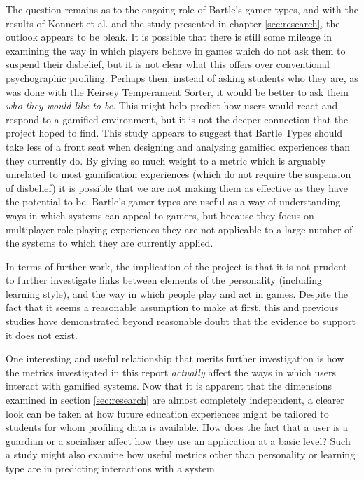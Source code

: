 \documentclass[12pt,a4paper,twoside]{report}
\begin{document}
The question remains as to the ongoing role of Bartle's gamer types, and with the results of Konnert et al. \cite{konertmodeling} and the study presented in chapter \ref{sec:research}, the outlook appears to be bleak. It is possible that there is still some mileage in examining the way in which players behave in games which do not ask them to suspend their disbelief, but it is not clear what this offers over conventional psychographic profiling. Perhaps then, instead of asking students who they are, as was done with the Keirsey Temperament Sorter, it would be better to ask them \textit{who they would like to be}. This might help predict how users would react and respond to a gamified environment, but it is not the deeper connection that the project hoped to find. This study appears to suggest that Bartle Types should take less of a front seat when designing and analysing gamified experiences than they currently do. By giving so much weight to a metric which is arguably unrelated to most gamification experiences (which do not require the suspension of disbelief) it is possible that we are not making them as effective as they have the potential to be. Bartle's gamer types are useful as a way of understanding ways in which systems can appeal to gamers, but because they focus on multiplayer role-playing experiences they are not applicable to a large number of the systems to which they are currently applied.

In terms of further work, the implication of the project is that it is not prudent to further investigate links between elements of the personality (including learning style), and the way in which people play and act in games. Despite the fact that it seems a reasonable assumption to make at first, this and previous studies have demonstrated beyond reasonable doubt that the evidence to support it does not exist.

One interesting and useful relationship that merits further investigation is how the metrics investigated in this report \textit{actually} affect the ways in which users interact with gamified systems. Now that it is apparent that the dimensions examined in section \ref{sec:research} are almost completely independent, a clearer look can be taken at how future education experiences might be tailored to students for whom profiling data is available. How does the fact that a user is a guardian or a socialiser affect how they use an application at a basic level? Such a study might also examine how useful metrics other than personality or learning type are in predicting interactions with a system.
\end{document}
